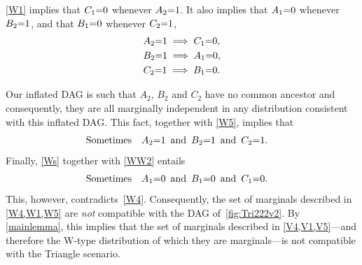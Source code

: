 \cref{W1} %
implies that $C_1\mathord{=} 0$ whenever $A_2 \mathord{=} 1$. It also implies that $A_1\mathord{=} 0$ whenever $B_2\mathord{=} 1$, and that $B_1\mathord{=} 0$ whenever $C_2\mathord{=} 1$, 
\begin{align} 
\begin{split}\label{Ws}
&A_2 \mathord{=} 1 \implies C_1\mathord{=} 0,\\
&B_2\mathord{=} 1 \implies A_1\mathord{=} 0,\\
&C_2 \mathord{=} 1 \implies B_1 \mathord{=} 0.
\end{split}
\end{align}

Our inflated DAG is such that $A_2$, $B_2$ and $C_2$ have no common ancestor and consequently, they are all marginally independent in any distribution consistent with this inflated DAG.  This fact, together with \cref{W5}, implies that %
\begin{align} \label{WW2}
\text{Sometimes} \quad &A_2 \mathord{=} 1\,\text{ and }\, B_2 \mathord{=} 1\,\text{ and }\, C_2 \mathord{=} 1.
\end{align} 
Finally, \cref{Ws} together with \cref{WW2} entails
\begin{align} \label{WW3}
\text{Sometimes} \quad &A_1 \mathord{=} 0\,\text{ and }\, B_1 \mathord{=} 0\,\text{ and }\, C_1 \mathord{=} 0.
\end{align}
This, however, contradicts~\cref{W4}.  Consequently, the set of marginals described in \cref{W4,W1,W5} are \emph{not} compatible with the DAG of~\cref{fig:Tri222v2}.  By \cref{mainlemma}, this implies that the set of marginals described in \cref{V4,V1,V5}---and therefore the W-type distribution of which they are marginals---is not compatible with the Triangle scenario.

